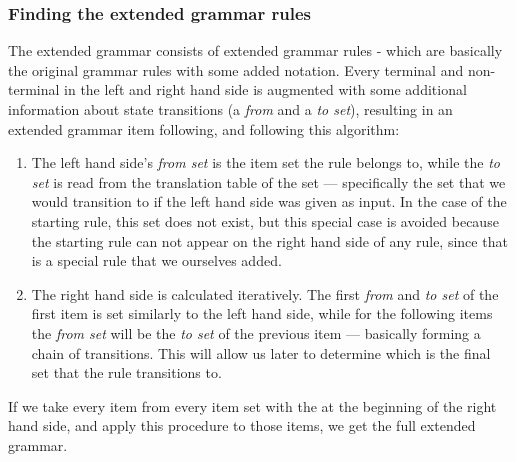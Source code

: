 \subsubsection{Finding the extended grammar rules} 
The extended grammar consists of extended grammar rules - which are basically the original grammar rules with some added notation. Every terminal and non-terminal in the left and right hand side is augmented with some additional information about state transitions (a \textit{from} and a \textit{to set}), resulting in an extended grammar item following, and following this algorithm:
\begin{enumerate}
\item The left hand side's \textit{from set} is the item set the rule belongs to, while the \textit{to set} is read from the translation table of the set --- specifically the set that we would transition to if the left hand side was given as input. In the case of the starting rule, this set does not exist, but this special case is avoided because the starting rule can not appear on the right hand side of any rule, since that is a special rule that we ourselves added.
\item The right hand side is calculated iteratively. The first \textit{from} and \textit{to set} of the first item is set similarly to the left hand side, while for the following items the \textit{from set} will be the \textit{to set} of the previous item --- basically forming a chain of transitions. This will allow us later to determine which is the final set that the rule transitions to.
\end{enumerate}
If we take every item from every item set with the \textbullet at the beginning of the right hand side, and apply this procedure to those items, we get the full extended grammar.
